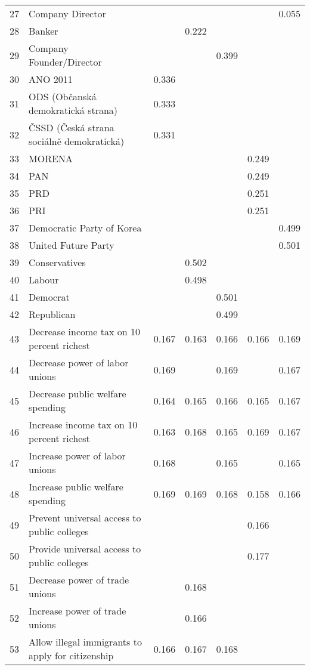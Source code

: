 \begin{longtable}{lp{7cm}ccccc}
  27 & Company Director &  &  &  &  & 0.055 \\ 
  28 & Banker &  & 0.222 &  &  &  \\ 
  29 & Company Founder/Director &  &  & 0.399 &  &  \\ 
  30 & ANO 2011 & 0.336 &  &  &  &  \\ 
  31 & ODS (Občanská demokratická strana) & 0.333 &  &  &  &  \\ 
  32 & ČSSD (Česká strana sociálně demokratická) & 0.331 &  &  &  &  \\ 
  33 & MORENA &  &  &  & 0.249 &  \\ 
  34 & PAN &  &  &  & 0.249 &  \\ 
  35 & PRD &  &  &  & 0.251 &  \\ 
  36 & PRI &  &  &  & 0.251 &  \\ 
  37 & Democratic Party of Korea &  &  &  &  & 0.499 \\ 
  38 & United Future Party &  &  &  &  & 0.501 \\ 
  39 & Conservatives &  & 0.502 &  &  &  \\ 
  40 & Labour &  & 0.498 &  &  &  \\ 
  41 & Democrat &  &  & 0.501 &  &  \\ 
  42 & Republican &  &  & 0.499 &  &  \\ 
  43 & Decrease income tax on 10 percent richest & 0.167 & 0.163 & 0.166 & 0.166 & 0.169 \\ 
  44 & Decrease power of labor unions & 0.169 &  & 0.169 &  & 0.167 \\ 
  45 & Decrease public welfare spending & 0.164 & 0.165 & 0.166 & 0.165 & 0.167 \\ 
  46 & Increase income tax on 10 percent richest & 0.163 & 0.168 & 0.165 & 0.169 & 0.167 \\ 
  47 & Increase power of labor unions & 0.168 &  & 0.165 &  & 0.165 \\ 
  48 & Increase public welfare spending & 0.169 & 0.169 & 0.168 & 0.158 & 0.166 \\ 
  49 & Prevent universal access to public colleges &  &  &  & 0.166 &  \\ 
  50 & Provide universal access to public colleges &  &  &  & 0.177 &  \\ 
  51 & Decrease power of trade unions &  & 0.168 &  &  &  \\ 
  52 & Increase power of trade unions &  & 0.166 &  &  &  \\ 
  53 & Allow illegal immigrants to apply for citizenship & 0.166 & 0.167 & 0.168 &  &  \\ 

\end{longtable}
